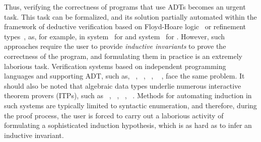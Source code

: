 Thus, verifying the correctness of programs that use ADTs becomes an urgent task.
This task can be formalized, and its solution partially automated within the framework of deductive verification based on Floyd-Hoare logic~\cite{Floyd1993,10.1145/363235.363259} or refinement types~\cite{713327}, as, for example, in \flux{} system~\cite{https://doi.org/10.48550/arxiv.2207.04034} for \rust{} and \leon{} system~\cite{10.1007/978-3-642-23702-7_23} for \scala{}.
However, such approaches require the user to provide \emph{inductive invariants} to prove the correctness of the program, and formulating them in practice is an extremely laborious task. Verification systems based on independent programming languages and supporting ADT, such as, \dafny{}~\cite{10.1007/978-3-642-17511-4_20}, \whyThree{}~\cite{10.1007/978-3-642-37036-6_8}, \viper{}~\cite{10.1007/978-3-662-49122-5_2}, \fstar{}~ \cite{10.1145/2914770.2837655}, face the same problem.
It should also be noted that algebraic data types underlie numerous interactive theorem provers (ITPs), such as \coq{}~\cite{barras1999coq}, \idris{}~\cite{brady_2013}, \agda{}~\cite{10.1145/3341691}, \lean{}~\cite{10.1007/978-3-030-79876-5_37}.
Methods for automating induction in such systems are typically limited to syntactic enumeration, and therefore, during the proof process, the user is forced to carry out a laborious activity of formulating a sophisticated induction hypothesis, which is as hard as to infer an inductive invariant.

